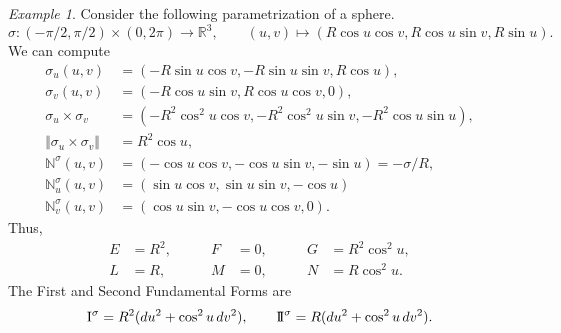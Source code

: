 \documentclass[11pt]{article}
\newcommand{\R}{\mathbb{R}}
\newcommand{\N}{\mathbb{N}}
\newcommand{\I}{{\rm I}}
\newcommand{\II}{{\rm I\!I}}
\newcommand{\norm}[1]{\Vert #1 \Vert}
\theoremstyle{definition}
\theoremstyle{remark}
\newtheorem*{example}{Example}
\numberwithin{equation}{section}
\begin{document}
    
    \begin{example}
        Consider the following parametrization of a sphere. \[
            \sigma\colon (-\pi / 2, \pi / 2)\times (0, 2\pi) \to \R^3, \qquad
            (u, v) \mapsto (R\cos{u}\cos{v}, R\cos{u}\sin{v}, R\sin{u}).
        \] We can compute \begin{align*}
            \sigma_u(u, v) &= (-R\sin{u}\cos{v}, -R\sin{u}\sin{v}, R\cos{u}), \\
            \sigma_v(u, v) &= (-R\cos{u}\sin{v}, R\cos{u}\cos{v}, 0), \\
            \sigma_u\times\sigma_v &= (-R^2\cos^2{u}\cos{v},
            -R^2\cos^2{u}\sin{v}, -R^2\cos{u}\sin{u}), \\
            \norm{\sigma_u\times\sigma_v} &= R^2\cos{u}, \\
            \N^\sigma(u, v) &= (-\cos{u}\cos{v},
            -\cos{u}\sin{v}, -\sin{u}) = -\sigma / R, \\
            \N^\sigma_u(u, v) &= (\sin{u}\cos{v}, \sin{u}\sin{v}, -\cos{u}) \\
            \N^\sigma_v(u, v) &= (\cos{u}\sin{v}, -\cos{u}\cos{v}, 0).
        \end{align*}
        Thus, \begin{align*}
            E &= R^2, &\qquad F &= 0, &\qquad G &= R^2\cos^2{u}, \\
            L &= R, &\qquad M &= 0, &\qquad N &= R\cos^2{u}.
        \end{align*}
        The First and Second Fundamental Forms are \[
            \I^\sigma = R^2(du^2 + \cos^2{u}\,dv^2), \qquad
            \II^\sigma = R(du^2 + \cos^2{u}\,dv^2).
        \]
    \end{example}
\end{document}
